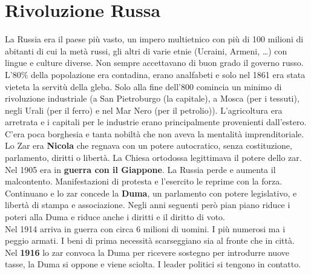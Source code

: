 
\section{Rivoluzione Russa}
La Russia era il paese più vasto, un impero multietnico con più di 100 milioni di abitanti di cui
la metà russi, gli altri di varie etnie (Ucraini, Armeni, \ldots) con lingue e culture diverse. Non
sempre accettavano di buon grado il governo russo.\\
L'80\% della popolazione era contadina, erano analfabeti e solo nel 1861 era stata vieteta la
servitù della gleba. Solo alla fine dell'800 comincia un minimo di rivoluzione industriale (a San
Pietroburgo (la capitale), a Mosca (per i tessuti), negli Urali (per il ferro) e nel Mar Nero (per il
petrolio)). L'agricoltura era arretrata e i capitali per le industrie erano principalmente 
provenienti dall'estero. C'era poca borghesia e tanta nobiltà che non aveva la mentalità 
imprenditoriale.\\
Lo Zar era \textbf{Nicola } che regnava con un potere autocratico, senza costituzione, 
parlamento, diritti o libertà. La Chiesa ortodossa legittimava il potere dello zar.\\ [\baselineskip]
Nel 1905 era in \textbf{guerra con il Giappone}. La Russia perde e aumenta il malcontento. 
Manifestazioni di protesta e l'esercito le reprime con la forza. Continuano e lo zar concede la
\textbf{Duma}, un parlamento con potere legislativo, e libertà di stampa e associazione. Negli anni
seguenti però pian piano riduce i poteri alla Duma e riduce anche i diritti e il diritto di voto.\\
Nel 1914 arriva in guerra con circa 6 milioni di uomini. I più numerosi ma i peggio armati. I beni
di prima necessità scarseggiano sia al fronte che in città.\\
Nel \textbf{1916} lo zar convoca la Duma per ricevere sostegno per introdurre nuove tasse, la Duma si
oppone e viene sciolta. I leader politici si tengono in contatto.

